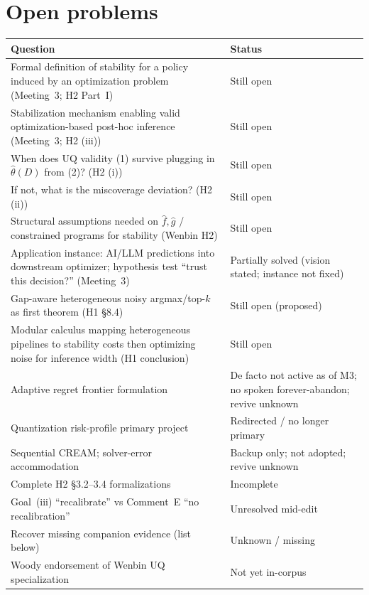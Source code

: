 \documentclass[11pt]{article}
\begin{document}
\section{Open problems}

\begin{center}
\begin{tabularx}{\linewidth}{@{}>{\RaggedRight\arraybackslash}X l@{}}
\toprule
\textbf{Question} & \textbf{Status} \\
\midrule
Formal definition of stability for a policy induced by an optimization problem
(Meeting~3; H2 Part~I) & Still open \\
\addlinespace
Stabilization mechanism enabling valid optimization-based post-hoc inference
(Meeting~3; H2 (iii)) & Still open \\
\addlinespace
When does UQ validity (1) survive plugging in $\hat\theta(D)$ from (2)? (H2 (i)) & Still open \\
\addlinespace
If not, what is the miscoverage deviation? (H2 (ii)) & Still open \\
\addlinespace
Structural assumptions needed on $\hat f,\hat g$ / constrained programs for stability
(Wenbin H2) & Still open \\
\addlinespace
Application instance: AI/LLM predictions into downstream optimizer; hypothesis test
``trust this decision?'' (Meeting~3) & Partially solved
(vision stated; instance not fixed) \\
\addlinespace
Gap-aware heterogeneous noisy argmax/top-$k$ as first theorem (H1 \S8.4) & Still open
(proposed) \\
\addlinespace
Modular calculus mapping heterogeneous pipelines to stability costs then optimizing noise
for inference width (H1 conclusion) & Still open \\
\addlinespace
Adaptive regret frontier formulation & De facto not active as of M3;
no spoken forever-abandon; revive unknown \\
\addlinespace
Quantization risk-profile primary project & Redirected / no longer primary \\
\addlinespace
Sequential CREAM; solver-error accommodation & Backup only; not adopted;
revive unknown \\
\addlinespace
Complete H2 \S3.2--3.4 formalizations & Incomplete \\
\addlinespace
Goal~(iii) ``recalibrate'' vs Comment~E ``no recalibration'' & Unresolved mid-edit \\
\addlinespace
Recover missing companion evidence (list below) & Unknown / missing \\
\addlinespace
Woody endorsement of Wenbin UQ specialization & Not yet in-corpus \\
\bottomrule
\end{tabularx}
\end{center}
\end{document}
